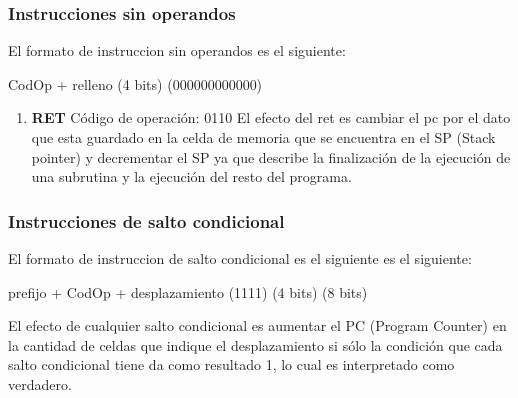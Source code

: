 \subsubsection{Instrucciones sin operandos}

El formato de instruccion sin operandos es el siguiente:

 CodOp     +    relleno 
(4 bits)     (000000000000)


\begin{enumerate}
\item \textbf{RET}
Código de operación: 0110
El efecto del ret es cambiar el pc por el dato que esta guardado en la celda de memoria que se encuentra en el SP (Stack pointer) y decrementar el SP ya que describe la finalización de la ejecución de una subrutina y la ejecución del resto del programa.
\end{enumerate}


\subsubsection{Instrucciones de salto condicional}

El formato de instruccion de salto condicional es el siguiente es el siguiente:

 prefijo +   CodOp   +  desplazamiento 
 (1111)     (4 bits)     (8 bits)

El efecto de cualquier salto condicional es aumentar el PC (Program Counter) en la cantidad de celdas que indique el desplazamiento si sólo la condición que cada salto condicional tiene da como resultado 1, lo cual es interpretado como verdadero.

